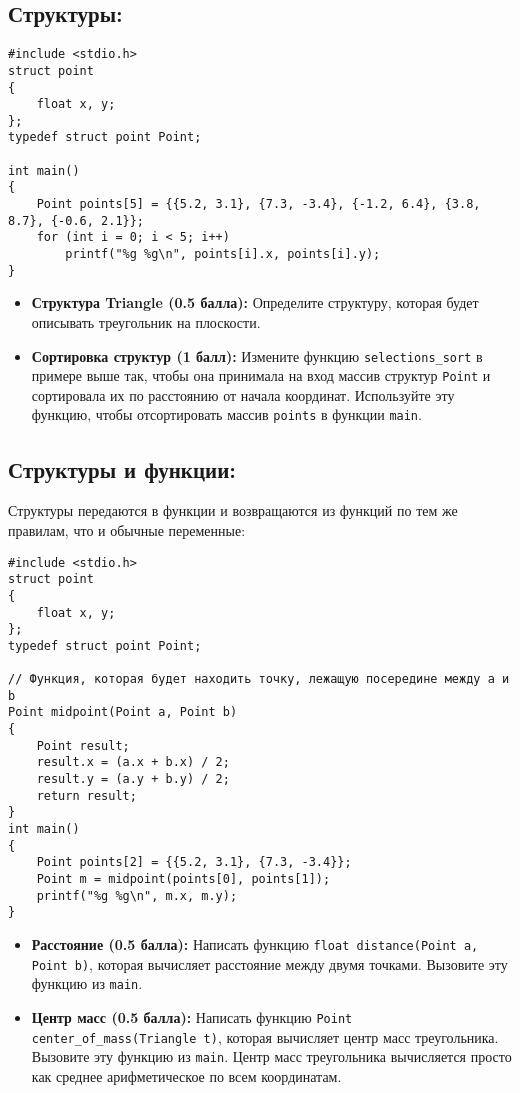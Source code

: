 \documentclass{article}
\begin{document}
\subsection*{Структуры:}
\begin{lstlisting}
#include <stdio.h>
struct point
{
	float x, y;
};
typedef struct point Point;

int main()
{
	Point points[5] = {{5.2, 3.1}, {7.3, -3.4}, {-1.2, 6.4}, {3.8, 8.7}, {-0.6, 2.1}};
	for (int i = 0; i < 5; i++)
		printf("%g %g\n", points[i].x, points[i].y);
}
\end{lstlisting}
\begin{itemize}
\item \textbf{Структура Triangle (0.5 балла):} Определите структуру, которая будет описывать треугольник на плоскости.
\item \textbf{Сортировка структур (1 балл):} Измените функцию \texttt{selections\_sort} в примере выше так, чтобы она принимала на вход массив структур \texttt{Point} и сортировала их по расстоянию от начала координат. Используйте эту функцию, чтобы отсортировать массив \texttt{points} в функции \texttt{main}.
\end{itemize}


\subsection*{Структуры и функции:}
Структуры передаются в функции и возвращаются из функций по тем же правилам, что и обычные переменные:
\begin{lstlisting}
#include <stdio.h>
struct point
{
	float x, y;
};
typedef struct point Point;

// Функция, которая будет находить точку, лежащую посередине между a и b
Point midpoint(Point a, Point b)
{
	Point result;
	result.x = (a.x + b.x) / 2;
	result.y = (a.y + b.y) / 2;
	return result;
}
int main()
{
	Point points[2] = {{5.2, 3.1}, {7.3, -3.4}};
	Point m = midpoint(points[0], points[1]);
	printf("%g %g\n", m.x, m.y);
}
\end{lstlisting}

\begin{itemize}
\item \textbf{Расстояние (0.5 балла):} Написать функцию \texttt{float distance(Point a, Point b)}, которая вычисляет расстояние между двумя точками. Вызовите эту функцию из \texttt{main}.
\item \textbf{Центр масс (0.5 балла):} Написать функцию \texttt{Point center\_of\_mass(Triangle t)}, которая вычисляет центр масс треугольника. Вызовите эту функцию из \texttt{main}. Центр масс треугольника вычисляется просто как среднее арифметическое по всем координатам.
\end{itemize}
\end{document}
